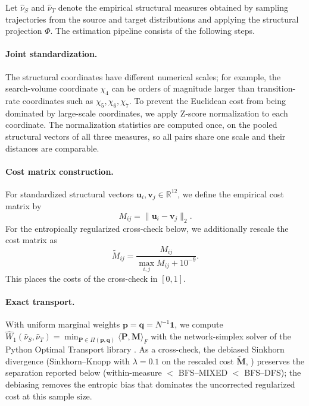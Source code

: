 Let $\hat{\nu}_S$ and $\hat{\nu}_T$ denote the empirical structural measures obtained by sampling trajectories from the source and target distributions and applying the structural projection $\Phi$. 
The estimation pipeline consists of the following steps.

\paragraph{Joint standardization.}
The structural coordinates have different numerical scales; for example, the search-volume coordinate $\chi_4$ can be orders of magnitude larger than transition-rate coordinates such as $\chi_5,\chi_6,\chi_7$. 
To prevent the Euclidean cost from being dominated by large-scale coordinates, we apply Z-score normalization to each coordinate. 
The normalization statistics are computed once, on the pooled structural vectors of all three measures, so all pairs share one scale and their distances are comparable.

\paragraph{Cost matrix construction.}
For standardized structural vectors $\boldsymbol{u}_i,\boldsymbol{v}_j\in\mathbb{R}^{12}$, we define the empirical cost matrix by
\begin{equation}
M_{ij}=\|\boldsymbol{u}_i-\boldsymbol{v}_j\|_2.
\end{equation}
For the entropically regularized cross-check below, we additionally rescale the cost matrix as
\begin{equation}
\widetilde M_{ij}
=
\frac{M_{ij}}{\max_{i,j} M_{ij}+10^{-9}}.
\end{equation}
This places the costs of the cross-check in $[0,1]$.

\paragraph{Exact transport.}
With uniform marginal weights $\mathbf{p}=\mathbf{q}=N^{-1}\mathbf{1}$, we compute $\widehat W_{1}(\hat{\nu}_S,\hat{\nu}_T)=\min_{\mathbf{P}\in\Pi(\mathbf{p},\mathbf{q})}\langle \mathbf{P},\mathbf{M}\rangle_F$ with the network-simplex solver of the Python Optimal Transport library \citep{flamary2021pot}. As a cross-check, the debiased Sinkhorn divergence (Sinkhorn--Knopp with $\lambda=0.1$ on the rescaled cost $\widetilde{\mathbf{M}}$, \citealp{cuturi2013sinkhorndistanceslightspeedcomputation}) preserves the separation reported below (within-measure $<$ BFS--MIXED $<$ BFS--DFS); the debiasing removes the entropic bias that dominates the uncorrected regularized cost at this sample size.

